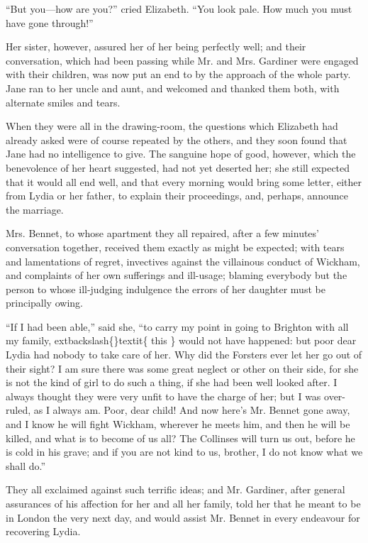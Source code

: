 \documentclass[10pt]{book}
\begin{document}
   “But you—how are you?” cried Elizabeth. “You look pale. How much you
must have gone through!”
  

   Her sister, however, assured her of her being perfectly well; and their
conversation, which had been passing while Mr. and Mrs. Gardiner were
engaged with their children, was now put an end to by the approach of
the whole party. Jane ran to her uncle and aunt, and welcomed and
thanked them both, with alternate smiles and tears.
  

   When they were all in the drawing-room, the questions which Elizabeth
had already asked were of course repeated by the others, and they soon
found that Jane had no intelligence to give. The sanguine hope of good,
however, which the benevolence of her heart suggested, had not yet
deserted her; she still expected that it would all end well, and that
every morning would bring some letter, either from Lydia or her father,
to explain their proceedings, and, perhaps, announce the marriage.
  

   Mrs. Bennet, to whose apartment they all repaired, after a few minutes’
conversation together, received them exactly as might be expected; with
tears and lamentations of regret, invectives against the villainous
conduct of Wickham, and complaints of her own sufferings and ill-usage;
blaming everybody but the person to whose ill-judging indulgence the
errors of her daughter must be principally owing.
  

   “If I had been able,” said she, “to carry my point in going to Brighton
with all my family,
   	extbackslash\{\}textit\{
    this
   \}
   would not
   have happened: but poor dear Lydia
had nobody to take care of her. Why did the Forsters ever let her go out
of their sight? I am sure there was some great neglect or other on their
side, for she is not the kind of girl to do such a thing, if she had
been well looked after. I always thought they were very unfit to have
the charge of her; but I was over-ruled, as I always am. Poor, dear
child! And now here’s Mr. Bennet gone away, and I know he will fight
Wickham, wherever he meets him, and then he will be killed, and what is
to become of us all? The Collinses will turn us out, before he is cold
in his grave; and if you are not kind to us, brother, I do not know what
we shall do.”
  

   They all exclaimed against such terrific ideas; and Mr. Gardiner, after
general assurances of his affection for her and all her family, told her
that he meant to be in London the very next day, and would assist Mr.
Bennet in every endeavour for recovering Lydia.
  
\end{document}
